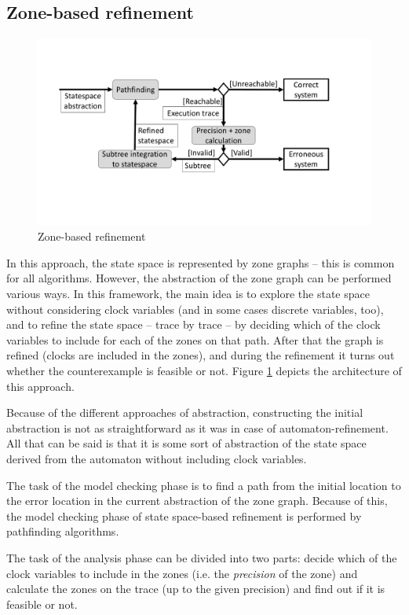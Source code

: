 \begin{runningExample}
\subsection{Zone-based refinement}

\begin{figure} 
	\centering
	\includegraphics[width=.7\textwidth]{include/figures/alg_arch_ssp}
	\caption{Zone-based refinement}
	\label{fig:cegarssp}
\end{figure}


 In this approach, the state space is represented by zone graphs -- this is common for all algorithms. However, the abstraction of the zone graph can be performed various ways. In this framework, the main idea is to explore the state space without considering clock variables (and in some cases discrete variables, too), and to refine the state space -- trace by trace -- by deciding which of the clock variables to include for each of the zones on that path. After that the graph is refined (clocks are included in the zones), and during the refinement it turns out whether the counterexample is feasible or not. Figure \ref{fig:cegarssp} depicts the architecture of this approach.

Because of the different approaches of abstraction, constructing the initial abstraction is not as straightforward as it was in case of automaton-refinement. All that can be said is that it is some sort of abstraction of the state space derived from the automaton without including clock variables.

The task of the model checking phase is to find a path from the initial location to the error location in the current abstraction of the zone graph. Because of this, the model checking phase of state space-based refinement is performed by pathfinding algorithms.

The task of the analysis phase can be divided into two parts:  decide which of the clock variables to include in the zones (i.e. the \emph{precision} of the zone) and calculate the zones on the trace (up to the given precision) and find out if it is feasible or not. 


\end{runningExample}
